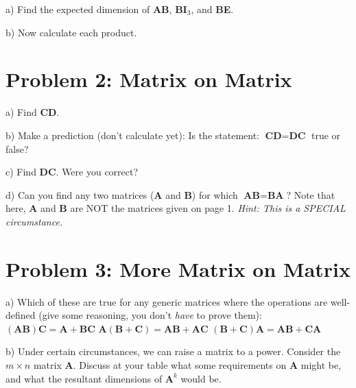 \documentclass{article}
\begin{document}
\begin{flushleft}
a) Find the expected dimension of \textbf{AB}, \textbf{BI$_3$}, and \textbf{BE}.

\newpage

b) Now calculate each product.

\vspace{5in}

\section*{Problem 2: Matrix on Matrix}

a) Find \textbf{CD}.

\vspace{2in}

b) Make a prediction (don't calculate yet): Is the statement:  $\textbf{CD} = \textbf{DC}$ true or false?

\newpage

c) Find \textbf{DC}. Were you correct?

\vspace{1.5in}

d) Can you find any two matrices (\textbf{A} and \textbf{B}) for which $\textbf{AB}=\textbf{BA}$?  Note that here, \textbf{A} and \textbf{B} are NOT the matrices given on page 1. \textit{Hint: This is a SPECIAL circumstance.}

\vspace{1in}

\section*{Problem 3: More Matrix on Matrix}

a) Which of these are true for any generic matrices where the operations are well-defined (give some reasoning, you don't \textit{have} to prove them):\\
$(\textbf{AB})\textbf{C}=\textbf{A}+\textbf{BC}$ \hspace{0.2in} $\textbf{A}(\textbf{B}+\textbf{C})=\textbf{AB}+\textbf{AC}$ \hspace{0.2in} $(\textbf{B}+\textbf{C})\textbf{A}=\textbf{AB}+\textbf{CA}$

\vspace{2in}

b) Under certain circumstances, we can raise a matrix to a power.  Consider the $m \times n$ matrix $\textbf{A}$.  Discuss at your table what some requirements on $\textbf{A}$ might be, and what the resultant dimensions of $\textbf{A}^{k}$ would be.


\end{flushleft}
\end{document}
